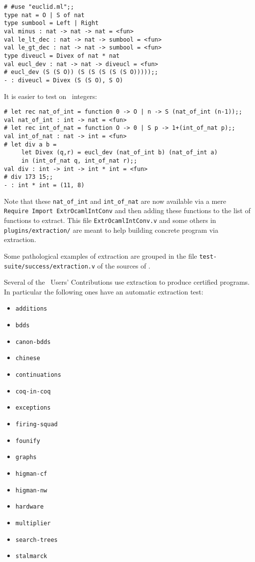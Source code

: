 \begin{verbatim}
# #use "euclid.ml";;
type nat = O | S of nat
type sumbool = Left | Right
val minus : nat -> nat -> nat = <fun>
val le_lt_dec : nat -> nat -> sumbool = <fun>
val le_gt_dec : nat -> nat -> sumbool = <fun>
type diveucl = Divex of nat * nat
val eucl_dev : nat -> nat -> diveucl = <fun>
# eucl_dev (S (S O)) (S (S (S (S (S O)))));;
- : diveucl = Divex (S (S O), S O)
\end{verbatim}
It is easier to test on \ocaml\ integers:
\begin{verbatim}
# let rec nat_of_int = function 0 -> O | n -> S (nat_of_int (n-1));;
val nat_of_int : int -> nat = <fun>
# let rec int_of_nat = function O -> 0 | S p -> 1+(int_of_nat p);;
val int_of_nat : nat -> int = <fun>
# let div a b = 
     let Divex (q,r) = eucl_dev (nat_of_int b) (nat_of_int a)
     in (int_of_nat q, int_of_nat r);;
val div : int -> int -> int * int = <fun>
# div 173 15;;
- : int * int = (11, 8)
\end{verbatim}

Note that these {\tt nat\_of\_int} and {\tt int\_of\_nat} are now
available via a mere {\tt Require Import ExtrOcamlIntConv} and then
adding these functions to the list of functions to extract. This file
{\tt ExtrOcamlIntConv.v} and some others in {\tt plugins/extraction/}
are meant to help building concrete program via extraction.


Some pathological examples of extraction are grouped in the file
{\tt test-suite/success/extraction.v} of the sources of \Coq.


Several of the \Coq\ Users' Contributions use extraction to produce
certified programs. In particular the following ones have an automatic
extraction test:

\begin{itemize}
\item {\tt additions}
\item {\tt bdds}
\item {\tt canon-bdds}
\item {\tt chinese}
\item {\tt continuations}
\item {\tt coq-in-coq}
\item {\tt exceptions}
\item {\tt firing-squad}
\item {\tt founify}
\item {\tt graphs}
\item {\tt higman-cf}
\item {\tt higman-nw}
\item {\tt hardware}
\item {\tt multiplier}
\item {\tt search-trees}
\item {\tt stalmarck}
\end{itemize}

